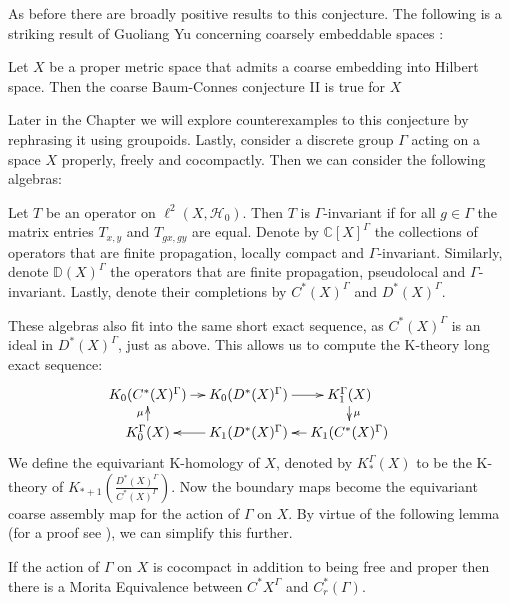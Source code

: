 \begin{conjecture}
As before there are broadly positive results to this conjecture. The following is a striking result of Guoliang Yu concerning coarsely embeddable spaces \cite{MR1728880}:
\begin{theorem}
Let $X$ be a proper metric space that admits a coarse embedding into Hilbert space. Then the coarse Baum-Connes conjecture II is true for $X$ 
\end{theorem}
Later in the Chapter we will explore counterexamples to this conjecture by rephrasing it using groupoids. Lastly, consider a discrete group $\Gamma$ acting on a space $X$ properly, freely and cocompactly. Then we can consider the following algebras:

\begin{definition}
Let $T$ be an operator on $\ell^{2}(X,\mathcal{H}_{0})$. Then $T$ is $\Gamma$-invariant if for all $g \in \Gamma$ the matrix entries $T_{x,y}$ and $T_{gx,gy}$ are equal. Denote by $\mathbb{C}[X]^{\Gamma}$ the collections of operators that are finite propagation, locally compact and $\Gamma$-invariant. Similarly, denote $\mathbb{D}(X)^{\Gamma}$ the operators that are finite propagation, pseudolocal and $\Gamma$-invariant. Lastly, denote their completions by $C^{*}(X)^{\Gamma}$ and $D^{*}(X)^{\Gamma}$.
\end{definition}

These algebras also fit into the same short exact sequence, as $C^{*}(X)^{\Gamma}$ is an ideal in $D^{*}(X)^{\Gamma}$, just as above. This allows us to compute the K-theory long exact sequence:
\begin{equation*}
\xymatrix@=1em{
K_{0}(C^{*}(X)^{\Gamma}) \ar[r] & K_{0}(D^{*}(X)^{\Gamma}) \ar[r]& K_{1}^{\Gamma}(X)\ar[d]^{\mu} & \\
K_{0}^{\Gamma}(X)\ar[u]^{\mu}& K_{1}(D^{*}(X)^{\Gamma}) \ar[l]& K_{1}(C^{*}(X)^{\Gamma})\ar[l] &
}
\end{equation*}
We define the equivariant K-homology of $X$, denoted by $K_{*}^{\Gamma}(X)$ to be the K-theory of $K_{*+1}(\frac{D^{*}(X)^{\Gamma}}{C^{*}(X)^{\Gamma}}).$  Now the boundary maps become the equivariant coarse assembly map for the action of $\Gamma$ on $X$. By virtue of the following lemma (for a proof see \cite{explg1}), we can simplify this further.

\begin{lemma}
If the action of $\Gamma$ on $X$ is cocompact in addition to being free and proper then there is a Morita Equivalence between $C^{*}X^{\Gamma}$ and $C^{*}_{r}(\Gamma)$.
\end{lemma}


\end{conjecture}
